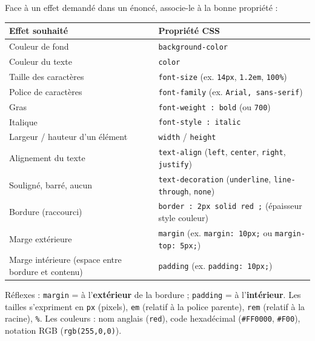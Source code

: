 \documentclass[11pt]{article}
\begin{document}
\begin{methode}
Face à un effet demandé dans un énoncé, associe-le à la bonne propriété :
\begin{center}
\begin{tabularx}{\linewidth}{|l|X|}\hline
\rowcolor{popblueL} \textbf{Effet souhaité} & \textbf{Propriété CSS} \\ \hline
Couleur de fond & \texttt{background-color} \\ \hline
Couleur du texte & \texttt{color} \\ \hline
Taille des caractères & \texttt{font-size} (ex. \texttt{14px}, \texttt{1.2em}, \texttt{100\%}) \\ \hline
Police de caractères & \texttt{font-family} (ex. \texttt{Arial, sans-serif}) \\ \hline
Gras & \texttt{font-weight : bold} (ou \texttt{700}) \\ \hline
Italique & \texttt{font-style : italic} \\ \hline
Largeur / hauteur d'un élément & \texttt{width} / \texttt{height} \\ \hline
Alignement du texte & \texttt{text-align} (\texttt{left}, \texttt{center}, \texttt{right}, \texttt{justify}) \\ \hline
Souligné, barré, aucun & \texttt{text-decoration} (\texttt{underline}, \texttt{line-through}, \texttt{none}) \\ \hline
Bordure (raccourci) & \texttt{border : 2px solid red ;} (épaisseur style couleur) \\ \hline
Marge extérieure & \texttt{margin} (ex. \texttt{margin: 10px;} ou \texttt{margin-top: 5px;}) \\ \hline
Marge intérieure (espace entre bordure et contenu) & \texttt{padding} (ex. \texttt{padding: 10px;}) \\ \hline
\end{tabularx}
\end{center}
Réflexes : \texttt{margin} = à l'\textbf{extérieur} de la bordure ; \texttt{padding} = à l'\textbf{intérieur}. Les tailles s'expriment en \texttt{px} (pixels), \texttt{em} (relatif à la police parente), \texttt{rem} (relatif à la racine), \texttt{\%}. Les couleurs : nom anglais (\texttt{red}), code hexadécimal (\texttt{\#FF0000}, \texttt{\#F00}), notation RGB (\texttt{rgb(255,0,0)}).
\end{methode}
\end{document}
